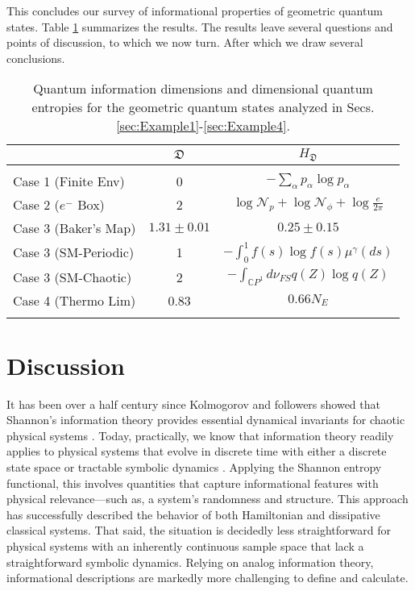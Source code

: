 \documentclass[draft,nofootinbib,pre,twocolumn,showkeys,superscriptaddress,preprintnumbers,floatfix]{revtex4-1}
\newcommand{\1}{\mathbbm{1}}
\begin{document}
This concludes our survey of informational properties of geometric quantum
states. Table \ref{tab:summary} summarizes the results. The results leave
several questions and points of discussion, to which we now turn. After which
we draw several conclusions.

\begin{table}[ht]
\small
\begin{tabular}{l|c|c}
& $\mathfrak{D}$ & $H_{\mathfrak{D}}$ \\
\hline
\hline
& & \\
Case 1 (Finite Env)& 0 & $- \sum_{\alpha}p_\alpha \log p_\alpha$  \\
Case 2 ($e^-$ Box)& 2 & $\log \mathcal{N}_p + \log \mathcal{N}_{\phi} + \log \frac{e}{2\pi}$ \\
Case 3 (Baker's Map)  & $1.31 \pm 0.01$ & $0.25 \pm 0.15$  \\
Case 3 (SM-Periodic) & 1 &  $-\int_0^1 f(s) \log f(s) \mu^\gamma(ds)$\\
Case 3 (SM-Chaotic) & 2 & $- \int_{\!\mathbb{C}P^1} \!d\nu_{FS} q(Z) \log q(Z)$\\
Case 4 (Thermo Lim) & 0.83 & $0.66 N_E$\\
& & \\
\hline
\end{tabular}
\caption{Quantum information dimensions and dimensional quantum entropies for
	the geometric quantum states analyzed in Secs.
	\ref{sec:Example1}-\ref{sec:Example4}.
	}
\label{tab:summary}
\end{table}

\section{Discussion}
\label{sec:Discussion}

It has been over a half century since Kolmogorov and followers showed that
Shannon's information theory \cite{Shan48a} provides essential dynamical
invariants for chaotic physical systems
\cite{Gelf56a,Kolm56a,Kolm59b,Kolm58,Kolm59,Sina59}. Today, practically, we
know that information theory readily applies to physical systems that evolve in
discrete time with either a discrete state space or tractable symbolic dynamics
\cite{Crut01a}. Applying the Shannon entropy functional, this involves
quantities that capture informational features with physical relevance---such
as, a system's randomness and structure. This approach has successfully
described the behavior of both Hamiltonian and dissipative classical systems.
That said, the situation is decidedly less straightforward for physical systems
with an inherently continuous sample space that lack a straightforward symbolic
dynamics. Relying on analog information theory, informational descriptions are
markedly more challenging to define and calculate.
\end{document}
